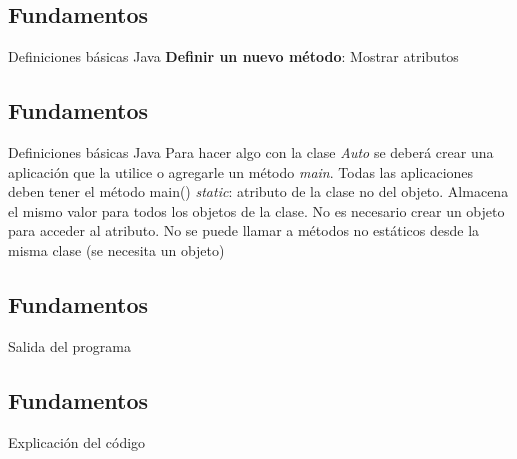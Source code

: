 \subsection{Fundamentos}
\begin{frame}{Definiciones básicas Java}
\textbf{Definir un nuevo método}: Mostrar atributos
 \scriptsize{
}
\end{frame}

\subsection{Fundamentos}
\begin{frame}{Definiciones básicas Java}
Para hacer algo con la clase \textit{Auto} se deberá crear una aplicación que la utilice o agregarle un método \textit{main}. Todas las aplicaciones deben tener el método main()
\footnotesize{
}
\tiny  \textit{static}: atributo de la clase no del objeto. Almacena el mismo valor para todos los objetos de la clase. No es necesario crear un objeto para acceder al atributo. No se puede llamar a métodos no estáticos desde la misma clase (se necesita un objeto)

\end{frame}

\subsection{Fundamentos}
\begin{frame}{Salida del programa}
\end{frame}


\subsection{Fundamentos}
\begin{frame}{Explicación del código}
\end{frame}

